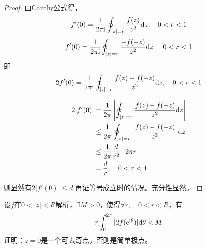 \begin{proof}

    由\textup{Cauthy}公式得，
    $$f'(0) = \dfrac{1}{2\mathrm{\pi i}} \oint_{|z| = r}{\dfrac{f(z)}{z^2}}\mathrm{d} z, \quad 0 < r < 1 $$
    $$f'(0) = \dfrac{1}{2\mathrm{\pi i}} \oint_{|z| = r}{\dfrac{-f(-z)}{z^2}}\mathrm{d} z, \quad 0 < r < 1 $$
    即
    $$2f'(0) = \dfrac{1}{2\mathrm{\pi i}} \oint_{|z| = r}{\dfrac{f(z)-f(-z)}{z^2}}\mathrm{d} z, \quad 0 < r < 1$$

    \begin{align*}
        2|f'(0)| & = \dfrac{1}{2 \pi} \left| \oint_{|z| = r}{\dfrac{f(z)-f(-z)}{z^2}}\mathrm{d} z \right| \\
        & \leq \dfrac{1}{2 \pi} \oint_{|z|=r}{\left|\dfrac{f(z)-f(-z)}{z^2}\right|}\mathrm{d} z\\
        & \leq \dfrac{1}{2 \pi} \dfrac{d}{r^2} \cdot 2 \pi r\\
        & = \dfrac{d}{r}, \quad 0 < r < 1
    \end{align*}

    则显然有$2|f'(0)| \leq d$
    再证等号成立时的情况。充分性显然。

\end{proof}

\begin{proposition}
    
    设$f$在$0 < |z| < R$解析，$\exists M >0$，使得$\forall r,\quad 0 < r < R$，有
    $$r \int_{0}^{2 \pi}{|2f(\mathrm{e^{i\theta}})|}\mathrm{d} \theta < M$$
    证明：$z=0$是一个可去奇点，否则是简单极点。

\end{proposition}

